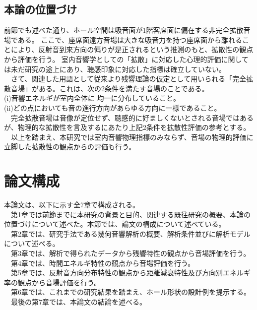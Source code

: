 \subsection{本論の位置づけ}
前節でも述べた通り、ホール空間は吸音面が1階客席面に偏在する非完全拡散音場である。
ここで、座席面遠方音場は大きな吸音力を持つ座席面から離れることにより、反射音到来方向の偏りが是正されるという推測のもと、拡散性の観点から評価を行う。
室内音響学としての「拡散」に対応した心理的評価に関しては未だ研究の途上にあり、聴感印象に対応した指標は確立していない。
\\　さて、関連した用語として従来より残響理論の仮定として用いられる「完全拡散音場」がある。これは、次の2条件を満たす音場のことである。
\\(i)音響エネルギが室内全体に 均一に分布していること。
\\(i\hspace{-.05em}i)どの点においても音の進行方向があらゆる方向に一様であること。
\\　完全拡散音場は音像が定位せず、聴感的に好ましくないとされる音場ではあるが、物理的な拡散性を言及するにあたり上記2条件を拡散性評価の参考とする。
\\　以上を踏まえ、本研究では室内音響物理指標のみならず、音場の物理的評価に立脚した拡散性の観点からの評価も行う。
\section{論文構成}
本論文は、以下に示す全7章で構成される。
\\　第1章では前節までに本研究の背景と目的、関連する既往研究の概要、本論の位置づけについて述べた。本節では、論文の構成について述べている。
\\　第2章では、研究手法である幾何音響解析の概要、解析条件並びに解析モデルについて述べる。
\\　第3章では、解析で得られたデータから残響特性の観点から音場評価を行う。
\\　第4章では、時間エネルギ特性の観点から音場評価を行う。
\\　第5章では、反射音方向分布特性の観点から距離減衰特性及び方向別エネルギ率の観点から音場評価を行う。
\\　第6章では、これまでの研究結果を踏まえ、ホール形状の設計例を提示する。
\\　最後の第7章では、本論文の結論を述べる。
